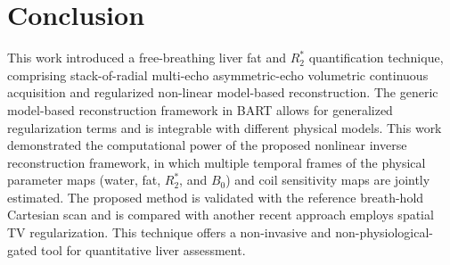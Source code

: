 \documentclass[journal,twoside,web]{ieeecolor}
\begin{document}
\section{Conclusion}

This work introduced a free-breathing liver fat and $R_2^*$ quantification 
technique, comprising stack-of-radial multi-echo asymmetric-echo volumetric continuous acquisition 
and regularized non-linear model-based reconstruction. 
The generic model-based reconstruction framework in BART allows for 
generalized regularization terms and is integrable with different physical models. 
This work demonstrated the computational power of 
the proposed nonlinear inverse reconstruction framework, 
in which multiple temporal frames of 
the physical parameter maps (water, fat, $R_2^*$, and $B_0$) 
and coil sensitivity maps are jointly estimated. 
The proposed method is validated with the reference breath-hold Cartesian scan and 
is compared with another recent approach employs spatial TV regularization. 
This technique offers a non-invasive and non-physiological-gated tool 
for quantitative liver assessment. 
\end{document}
